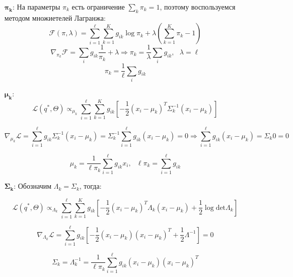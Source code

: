 \documentclass[12pt,a4paper]{article}
\begin{document}
\begin{itemize}
    \item [$\mathbf{\pi_k}$:] На параметры $\pi_k$ есть ограничение $\sum_k \pi_k = 1$, поэтому воспользуемся методом множиетелей Лагранжа:
    \begin{equation*}
        \mathcal{F}(\pi, \lambda) = \sum_{i = 1}^{\ell} \sum_{k = 1}^{K} g_{ik} \log \pi_k + \lambda \left(\sum_{k=1}^K \pi_k - 1\right)
    \end{equation*}
    \begin{equation*}
        \nabla_{\pi_k} \mathcal{F} = \sum_i g_{ik} \dfrac{1}{\pi_k} + \lambda \Rightarrow \pi_k = \dfrac{1}{\lambda} \sum_i g_{ik}, ~~~ \lambda = \ell
    \end{equation*}
    \begin{equation*}
        \pi_k = \dfrac{1}{\ell} \sum_i g_{ik}
    \end{equation*}
    
    \item [$\mathbf{\mu_k}$:] 
    \begin{equation*}
        \mathcal{L}(q^*, \Theta) \propto_{\mu_k} \sum_{i = 1}^{\ell} \sum_{k = 1}^{K} g_{ik} \left[ -\dfrac{1}{2}(x_i - \mu_k)^T \Sigma^{-1}_k (x_i - \mu_k) \right]
    \end{equation*}
    
    \begin{equation*}
        \nabla_{\mu_k} \mathcal{L} = \sum_{i = 1}^{\ell} g_{ik} \Sigma_k^{-1} (x_i - \mu_k) = \Sigma_k^{-1} \sum_{i = 1}^{\ell} g_{ik} (x_i - \mu_k) = 0 \Rightarrow \sum_{i = 1}^{\ell} g_{ik} (x_i - \mu_k) = \Sigma_{k} 0 = 0
    \end{equation*}
    
    \begin{equation*}
        \mu_k = \dfrac{1}{\ell \pi_k} \sum_{i = 1}^{\ell} g_{ik} x_i, ~~~ \ell \pi_k = \sum_{i=1}^{\ell} g_{ik}
    \end{equation*}
    
    \item[$\mathbf{\Sigma_k}$:] Обозначим $\Lambda_k = \Sigma_k$, тогда:
    
    \begin{equation*}
    \mathcal{L}(q^*, \Theta) \propto_{\Lambda_k} \sum_{i = 1}^{\ell} \sum_{k = 1}^{K} g_{ik} \left[ -\dfrac{1}{2}(x_i - \mu_k)^T \Lambda_k (x_i - \mu_k) + \dfrac{1}{2} \log \text{det} \Lambda_k \right]
    \end{equation*}

    \begin{equation*}
        \nabla_{\Lambda_k} \mathcal{L} = \sum_{i = 1}^{\ell} g_{ik} \left[- \dfrac{1}{2} (x_i - \mu_k) (x_i - \mu_k)^T + \dfrac{1}{2} \Lambda^{-1} \right] = 0
    \end{equation*}
    
    \begin{equation*}
        \Sigma_k = \Lambda^{-1}_k = \dfrac{1}{\ell \pi_k} \sum_{i = 1}^{\ell} g_{ik} (x_i - \mu_k) (x_i - \mu_k)^T
    \end{equation*}

\end{itemize}
\end{document}
